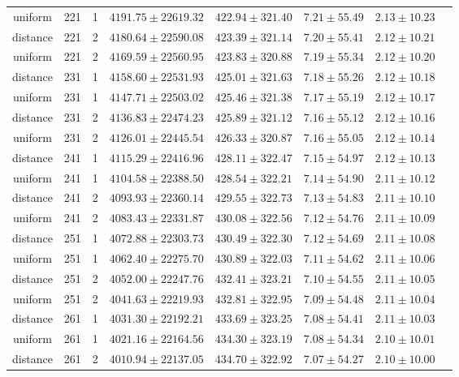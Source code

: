 \begin{tabular}{cccrrrrr}
uniform & 221 & 1 & $4191.75 \pm 22619.32$ & $422.94 \pm 321.40$ & $7.21 \pm 55.49$ & $2.13 \pm 10.23$\\
distance & 221 & 2 & $4180.64 \pm 22590.08$ & $423.39 \pm 321.14$ & $7.20 \pm 55.41$ & $2.12 \pm 10.21$\\
uniform & 221 & 2 & $4169.59 \pm 22560.95$ & $423.83 \pm 320.88$ & $7.19 \pm 55.34$ & $2.12 \pm 10.20$\\
distance & 231 & 1 & $4158.60 \pm 22531.93$ & $425.01 \pm 321.63$ & $7.18 \pm 55.26$ & $2.12 \pm 10.18$\\
uniform & 231 & 1 & $4147.71 \pm 22503.02$ & $425.46 \pm 321.38$ & $7.17 \pm 55.19$ & $2.12 \pm 10.17$\\
distance & 231 & 2 & $4136.83 \pm 22474.23$ & $425.89 \pm 321.12$ & $7.16 \pm 55.12$ & $2.12 \pm 10.16$\\
uniform & 231 & 2 & $4126.01 \pm 22445.54$ & $426.33 \pm 320.87$ & $7.16 \pm 55.05$ & $2.12 \pm 10.14$\\
distance & 241 & 1 & $4115.29 \pm 22416.96$ & $428.11 \pm 322.47$ & $7.15 \pm 54.97$ & $2.12 \pm 10.13$\\
uniform & 241 & 1 & $4104.58 \pm 22388.50$ & $428.54 \pm 322.21$ & $7.14 \pm 54.90$ & $2.11 \pm 10.12$\\
distance & 241 & 2 & $4093.93 \pm 22360.14$ & $429.55 \pm 322.73$ & $7.13 \pm 54.83$ & $2.11 \pm 10.10$\\
uniform & 241 & 2 & $4083.43 \pm 22331.87$ & $430.08 \pm 322.56$ & $7.12 \pm 54.76$ & $2.11 \pm 10.09$\\
distance & 251 & 1 & $4072.88 \pm 22303.73$ & $430.49 \pm 322.30$ & $7.12 \pm 54.69$ & $2.11 \pm 10.08$\\
uniform & 251 & 1 & $4062.40 \pm 22275.70$ & $430.89 \pm 322.03$ & $7.11 \pm 54.62$ & $2.11 \pm 10.06$\\
distance & 251 & 2 & $4052.00 \pm 22247.76$ & $432.41 \pm 323.21$ & $7.10 \pm 54.55$ & $2.11 \pm 10.05$\\
uniform & 251 & 2 & $4041.63 \pm 22219.93$ & $432.81 \pm 322.95$ & $7.09 \pm 54.48$ & $2.11 \pm 10.04$\\
distance & 261 & 1 & $4031.30 \pm 22192.21$ & $433.69 \pm 323.25$ & $7.08 \pm 54.41$ & $2.11 \pm 10.03$\\
uniform & 261 & 1 & $4021.16 \pm 22164.56$ & $434.30 \pm 323.19$ & $7.08 \pm 54.34$ & $2.10 \pm 10.01$\\
distance & 261 & 2 & $4010.94 \pm 22137.05$ & $434.70 \pm 322.92$ & $7.07 \pm 54.27$ & $2.10 \pm 10.00$\\

\end{tabular}
